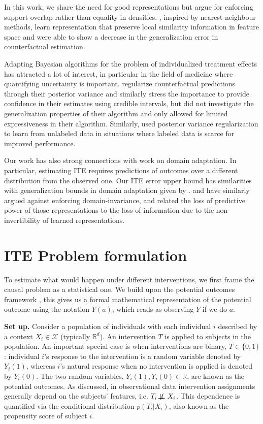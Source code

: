\documentclass[twoside]{article}
\newcommand{\notindep}{\not\!\perp\!\!\!\perp}
\begin{document}
In this work, we share the need for good representations but argue for enforcing support overlap rather than equality in densities. \cite{yao2018representation}, inspired by nearest-neighbour methods, learn representation that preserve local similarity information in feature space and were able to show a decrease in the generalization error in counterfactual estimation.

Adapting Bayesian algorithms for the problem of individualized treatment effects has attracted a lot of interest, in particular in the field of medicine where quantifying uncertainty is important. \cite{alaa2017bayesian} regularize counterfactual predictions through their posterior variance and similarly stress the importance to provide confidence in their estimates using credible intervals, but did not investigate the generalization properties of their algorithm and only allowed for limited expressiveness in their algorithm. Similarly, \cite{jean2018semi} used posterior variance regularization to learn from unlabeled data in situations where labeled data is scarce for improved performance. 

Our work has also strong connections with work on domain adaptation. In particular, estimating ITE requires predictions of outcomes over a different distribution from the observed one. Our ITE error upper bound has similarities with generalization bounds in domain adaptation given by \cite{johansson2016learning,johansson2018learning}. \cite{johansson2018learning} and \cite{zhao2019learning} have similarly argued against enforcing domain-invariance, and related the loss of predictive power of those representations to the loss of information due to the non-invertibility of learned representations. 
\section{ITE Problem formulation}
To estimate what would happen under different interventions, we first frame the causal problem as a statistical one. We build upon the potential outcomes framework \cite{rubin2005causal}, this gives us a formal mathematical representation of the potential outcome using the notation $Y (a)$, which reads as observing $Y$ if we do $a$. 

\textbf{Set up.} Consider a population of individuals with each individual $i$ described by a context $X_i \in \mathcal X$ (typically $\mathbb R^d$). An intervention $T$ is applied to subjects in the population. An important special case is when interventions are binary, $T \in \{0, 1\}$: individual $i$’s response to the intervention is a random variable denoted by $Y_i(1)$, whereas $i$'s natural response when no intervention is applied is denoted by $Y_i(0)$. The two random variables, $Y_i(1), Y_i(0) \in \mathbb R$, are known as the potential outcomes. As discussed, in observational data intervention assignments generally depend on the subjects’ features, i.e. $T_i \notindep X_i$. This dependence is quantified via the conditional distribution $p(T_i | X_i)$, also known as the propensity score of subject $i$.
\end{document}
